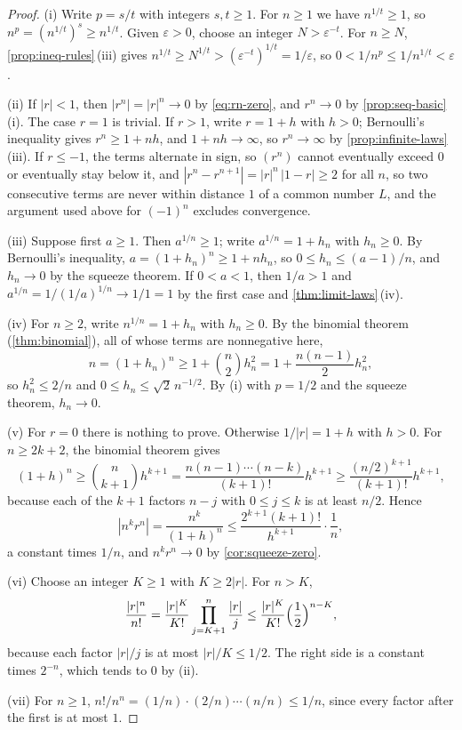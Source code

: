 \begin{proof}
(i) Write $p=s/t$ with integers $s,t\ge1$. For $n\ge1$ we have $n^{1/t}\ge1$, so $n^p=(n^{1/t})^s\ge n^{1/t}$. Given $\varepsilon>0$, choose an integer $N>\varepsilon^{-t}$. For $n\ge N$, \cref{prop:ineq-rules}\,(iii) gives $n^{1/t}\ge N^{1/t}>(\varepsilon^{-t})^{1/t}=1/\varepsilon$, so $0<1/n^p\le1/n^{1/t}<\varepsilon$.

(ii) If $|r|<1$, then $|r^n|=|r|^n\to0$ by \eqref{eq:rn-zero}, and $r^n\to0$ by \cref{prop:seq-basic}\,(i). The case $r=1$ is trivial. If $r>1$, write $r=1+h$ with $h>0$; Bernoulli's inequality gives $r^n\ge1+nh$, and $1+nh\to\infty$, so $r^n\to\infty$ by \cref{prop:infinite-laws}\,(iii). If $r\le-1$, the terms alternate in sign, so $(r^n)$ cannot eventually exceed $0$ or eventually stay below it, and $|r^n-r^{n+1}|=|r|^n\,|1-r|\ge2$ for all $n$, so two consecutive terms are never within distance $1$ of a common number $L$, and the argument used above for $(-1)^n$ excludes convergence.

(iii) Suppose first $a\ge1$. Then $a^{1/n}\ge1$; write $a^{1/n}=1+h_n$ with $h_n\ge0$. By Bernoulli's inequality, $a=(1+h_n)^n\ge1+nh_n$, so $0\le h_n\le(a-1)/n$, and $h_n\to0$ by the squeeze theorem. If $0<a<1$, then $1/a>1$ and $a^{1/n}=1/(1/a)^{1/n}\to1/1=1$ by the first case and \cref{thm:limit-laws}\,(iv).

(iv) For $n\ge2$, write $n^{1/n}=1+h_n$ with $h_n\ge0$. By the binomial theorem (\cref{thm:binomial}), all of whose terms are nonnegative here,
\[
n=(1+h_n)^n\ge1+\binom n2h_n^2=1+\frac{n(n-1)}2h_n^2 ,
\]
so $h_n^2\le2/n$ and $0\le h_n\le\sqrt2\,n^{-1/2}$. By (i) with $p=1/2$ and the squeeze theorem, $h_n\to0$.

(v) For $r=0$ there is nothing to prove. Otherwise $1/|r|=1+h$ with $h>0$. For $n\ge2k+2$, the binomial theorem gives
\[
(1+h)^n\ge\binom n{k+1}h^{k+1}=\frac{n(n-1)\cdots(n-k)}{(k+1)!}h^{k+1}\ge\frac{(n/2)^{k+1}}{(k+1)!}h^{k+1} ,
\]
because each of the $k+1$ factors $n-j$ with $0\le j\le k$ is at least $n/2$. Hence
\[
|n^kr^n|=\frac{n^k}{(1+h)^n}\le\frac{2^{k+1}(k+1)!}{h^{k+1}}\cdot\frac1n ,
\]
a constant times $1/n$, and $n^kr^n\to0$ by \cref{cor:squeeze-zero}.

(vi) Choose an integer $K\ge1$ with $K\ge2|r|$. For $n>K$,
\[
\frac{|r|^n}{n!}=\frac{|r|^K}{K!}\prod_{j=K+1}^{n}\frac{|r|}{j}\le\frac{|r|^K}{K!}\Bigl(\frac12\Bigr)^{n-K},
\]
because each factor $|r|/j$ is at most $|r|/K\le1/2$. The right side is a constant times $2^{-n}$, which tends to $0$ by (ii).

(vii) For $n\ge1$, $n!/n^n=(1/n)\cdot(2/n)\cdots(n/n)\le1/n$, since every factor after the first is at most $1$.
\end{proof}

